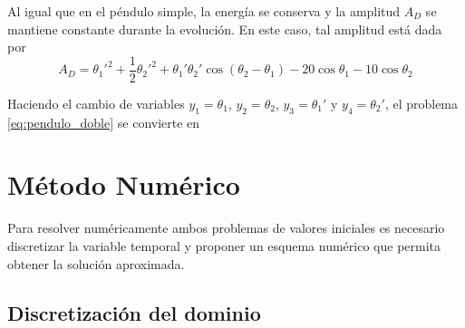 \documentclass[aps,prb,twocolumn,superscriptaddress,floatfix,longbibliography]{revtex4-2}
\begin{document}
Al igual que en el péndulo simple, la energía se conserva y la amplitud $A_D$ se mantiene constante durante la evolución. En este caso, tal amplitud está dada por
\begin{equation}
  A_D = \theta_1'^2 + \frac{1}{2} \theta_2'^2 + \theta_1' \theta_2' \cos{(\theta_2 - \theta_1)} - 20 \cos{\theta_1} - 10 \cos{\theta_2}
  \label{eq:amplitud_doble}
\end{equation}

Haciendo el cambio de variables $y_1 = \theta_1$, $y_2 = \theta_2$, $y_3 = \theta_1'$ y $y_4 = \theta_2'$, el problema \ref{eq:pendulo_doble} se convierte en


\section{Método Numérico}

Para resolver numéricamente ambos problemas de valores iniciales es necesario discretizar la variable temporal y proponer un esquema numérico que permita obtener la solución aproximada.

\subsection{Discretización del dominio}
\end{document}
